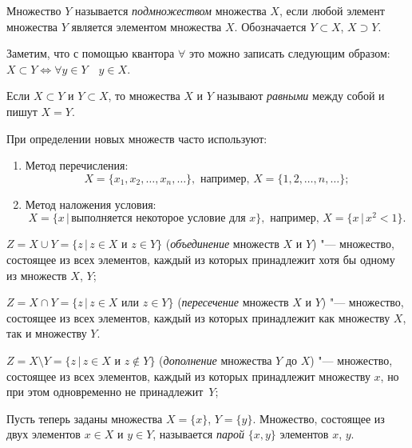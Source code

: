 \begin{defn}
Множество $Y$ называется \textit{подмножеством} множества $X$, если любой элемент множества $Y$ является элементом множества $X$. Обозначается $Y \subset X$, $X \supset Y$.
\end{defn}

Заметим, что с помощью квантора $\forall$ это можно записать следующим образом: $X \subset Y \Longleftrightarrow \forall y\in Y\quad  y\in X$. 

\begin{defn}
Если $X \subset Y$ и $Y \subset X$, то множества $X$ и $Y$ называют \textit{равными} между собой и пишут $X = Y$.
\end{defn}


При определении новых множеств часто используют:
\begin{enumerate}[wide, labelwidth=!, noitemsep]
\item 
Метод перечисления: 
$$
X = \{x_1,x_2,\dots,x_n,\dots \}, \text{ например, }
X = \{1, 2, \dots, n, \dots \};
$$

\item Метод наложения условия: 
$$
X = \{x\,\big|\, \text{выполняется некоторое условие для $x$}\}, \text{ например, }
X = \{x\,\big|\,x^2 < 1\}.
$$
\end{enumerate}

\begin{defn}
$Z = X \cup Y = \{z\,\big|\, z\in X \text{ и } z\in Y\}$ (\textit{объединение} множеств $X$ и $Y$) "--- множество, состоящее из всех элементов, каждый из которых принадлежит хотя бы одному из множеств $X$, $Y$;
\end{defn}
\begin{defn}
$Z = X \cap Y = \{z\,\big|\, z\in X \text{ или } z\in Y\}$ (\textit{пересечение} множеств $X$ и $Y$) "--- множество, состоящее из всех элементов, каждый из которых принадлежит как множеству $X$, так и множеству $Y$.
\end{defn}
\begin{defn}
$Z =X \setminus Y = \{z\,\big|\, z\in X \text{ и } z\notin Y\}$ (\textit{дополнение} множества $Y$ до $X$) "--- множество, состоящее из всех элементов, каждый из которых принадлежит множеству $x$, но при этом одновременно не принадлежит~$Y$;
\end{defn}

\begin{defn}
Пусть теперь заданы множества $X= \{x\}$, $Y = \{y\}$. Множество, состоящее из двух элементов $x\in X$ и $y\in Y$, называется \textit{парой} $\{x,y\}$ элементов $x$, $y$. 
\end{defn}

